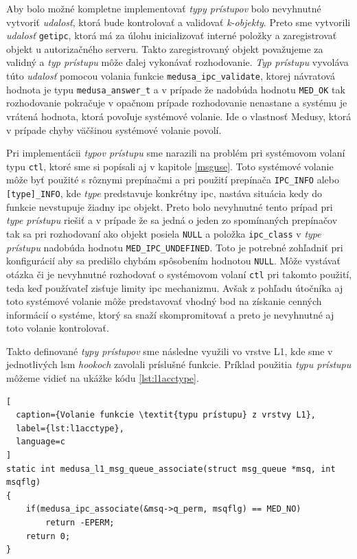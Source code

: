 Aby bolo možné kompletne implementovať \textit{typy prístupov} bolo nevyhnutné vytvoriť \textit{udalosť}, ktorá bude kontrolovať a validovať \textit{k-objekty}. Preto sme vytvorili \textit{udalosť} \texttt{getipc}, ktorá má za úlohu inicializovať interné položky a zaregistrovať objekt u autorizačného serveru. Takto zaregistrovaný objekt považujeme za validný a \textit{typ prístupu} môže ďalej vykonávať rozhodovanie. \textit{Typ prístupu} vyvoláva túto \textit{udalosť} pomocou volania funkcie \texttt{medusa\_ipc\_validate}, ktorej návratová hodnota je typu \texttt{medusa\_answer\_t} a v prípade že nadobúda hodnotu \texttt{MED\_OK} tak rozhodovanie pokračuje v opačnom prípade rozhodovanie nenastane a systému je vrátená hodnota, ktorá povoľuje systémové volanie. Ide o vlastnosť Medusy, ktorá v prípade chyby väčšinou systémové volanie povolí.

Pri implementácii \textit{typov prístupu} sme narazili na problém pri systémovom volaní typu \texttt{ctl}, ktoré sme si popísali aj v kapitole \ref{msguse}. Toto systémové volanie môže byť použité s rôznymi prepínačmi a pri použití prepínača \texttt{IPC\_INFO} alebo \texttt{[type]\_INFO}, kde \textit{type} predstavuje konkrétny \acrshort{ipc}, nastáva situácia kedy do funkcie nevstupuje žiadny \acrshort{ipc} objekt. Preto bolo nevyhnutné tento prípad pri \textit{type prístupu} riešiť a v prípade že sa jedná o jeden zo spomínaných prepínačov tak sa pri rozhodovaní ako objekt posiela \texttt{NULL} a položka \texttt{ipc\_class} v \textit{type prístupu} nadobúda hodnotu \texttt{MED\_IPC\_UNDEFINED}. Toto je potrebné zohľadniť pri konfigurácií aby sa predišlo chybám spôsobením hodnotou \texttt{NULL}. Môže vystávať otázka či je nevyhnutné rozhodovať o systémovom volaní \texttt{ctl} pri takomto použití, teda keď používateľ zisťuje limity \acrshort{ipc} mechanizmu. Avšak z pohľadu útočníka aj toto systémové volanie môže predstavovať vhodný bod na získanie cenných informácií o systéme, ktorý sa snaží skompromitovať a preto je nevyhnutné aj toto volanie kontrolovať.

Takto definované \textit{typy prístupov} sme následne využili vo vrstve L1, kde sme v jednotlivých \acrshort{lsm} \textit{hookoch} zavolali príslušné funkcie. Príklad použitia \textit{typu prístupu} môžeme vidieť na ukážke kódu \ref{lst:l1acctype}.
\begin{lstlisting}[
  caption={Volanie funkcie \textit{typu prístupu} z vrstvy L1},
  label={lst:l1acctype},
  language=c
]
static int medusa_l1_msg_queue_associate(struct msg_queue *msq, int msqflg)
{
	if(medusa_ipc_associate(&msq->q_perm, msqflg) == MED_NO)
		return -EPERM;	
	return 0;
}
\end{lstlisting}

